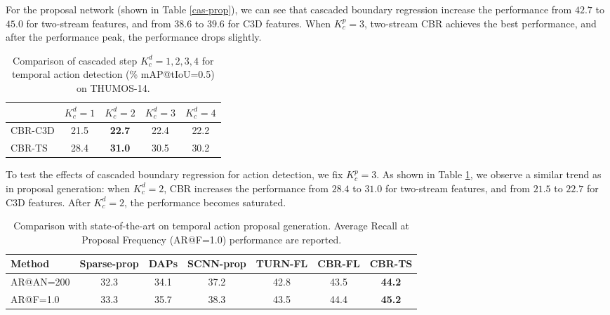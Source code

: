 \documentclass{bmvc2k}
\begin{document}
For the proposal network (shown in Table \ref{cas-prop}), we can see that cascaded boundary regression increase the performance from $42.7$ to $45.0$ for two-stream features, and from $38.6$ to $39.6$ for C3D features. When $K_c^p=3$, two-stream CBR achieves the best performance, and after the performance peak, the performance drops slightly. 

\begin{table}[h]\small
\centering
\caption{Comparison of cascaded step $K_c^d = 1,2,3,4 $ for temporal action detection (\% mAP@tIoU=0.5) on THUMOS-14.}
\label{cas-det}
\begin{tabular}{l|c|c|c|c}
\hline
           & $K_c^d=1$ & \multicolumn{1}{c|}{$K_c^d=2$} & \multicolumn{1}{c|}{$K_c^d=3$} & \multicolumn{1}{c}{$K_c^d=4$} \\ \hline
CBR-C3D        &   21.5  &      \textbf{22.7}      &       22.4       &     22.2      \\ \hline
CBR-TS &   28.4  &      \textbf{31.0}   &        30.5      &        30.2       \\ \hline
\end{tabular}
\end{table}

To test the effects of cascaded boundary regression for action detection, we fix $K_c^p=3$.  As shown in Table \ref{cas-det}, we observe a similar trend as in proposal generation: when $K_c^d=2$, CBR increases the performance from $28.4$ to $31.0$ for two-stream features, and from $21.5$ to $22.7$ for C3D features. After $K_c^d=2$, the performance becomes saturated. 

\begin{table}[h]\footnotesize
\centering
\caption{Comparison with state-of-the-art on temporal action proposal generation. Average Recall at Proposal Frequency (AR@F=1.0) performance are reported.}
\label{proposal-st}
\begin{tabular}{l|c|c|c|c||c|c}
\hline
Method & Sparse-prop\cite{Heilbron_2016_CVPR} & DAPs\cite{escorcia2016daps} & SCNN-prop\cite{Shou_2016_CVPR}  & TURN-FL \cite{gao2017turn}  & CBR-FL & CBR-TS \\ \hline
AR@AN=200 &  32.3  &  34.1    &    37.2 &  42.8   &   43.5   & \textbf{44.2}    \\   \hline 
AR@F=1.0 &  33.3  &  35.7    &    38.3 &  43.5   &   44.4   &  \textbf{45.2}  \\   \hline      
\end{tabular}
\end{table}
\end{document}
